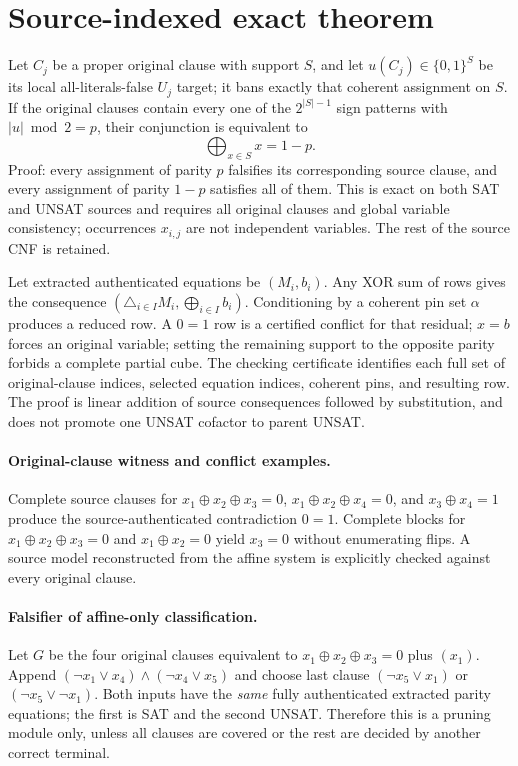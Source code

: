 \documentclass[11pt]{article}
\begin{document}
\section{Source-indexed exact theorem}
Let $C_j$ be a proper original clause with support $S$, and let $u(C_j)\in\{0,1\}^{S}$ be its local all-literals-false $U_j$ target; it bans exactly that coherent assignment on $S$. If the original clauses contain every one of the $2^{|S|-1}$ sign patterns with $|u|\bmod 2=p$, their conjunction is equivalent to
\[
\bigoplus_{x\in S}x=1-p.
\]
Proof: every assignment of parity $p$ falsifies its corresponding source clause, and every assignment of parity $1-p$ satisfies all of them. This is exact on both SAT and UNSAT sources and requires all original clauses and global variable consistency; occurrences $x_{i,j}$ are not independent variables. The rest of the source CNF is retained.

Let extracted authenticated equations be $(M_i,b_i)$. Any XOR sum of rows gives the consequence $(\triangle_{i\in I}M_i,\bigoplus_{i\in I}b_i)$. Conditioning by a coherent pin set $\alpha$ produces a reduced row. A $0=1$ row is a certified conflict for that residual; $x=b$ forces an original variable; setting the remaining support to the opposite parity forbids a complete partial cube. The checking certificate identifies each full set of original-clause indices, selected equation indices, coherent pins, and resulting row. The proof is linear addition of source consequences followed by substitution, and does not promote one UNSAT cofactor to parent UNSAT.

\paragraph{Original-clause witness and conflict examples.} Complete source clauses for $x_1\oplus x_2\oplus x_3=0$, $x_1\oplus x_2\oplus x_4=0$, and $x_3\oplus x_4=1$ produce the source-authenticated contradiction $0=1$. Complete blocks for $x_1\oplus x_2\oplus x_3=0$ and $x_1\oplus x_2=0$ yield $x_3=0$ without enumerating flips. A source model reconstructed from the affine system is explicitly checked against every original clause.

\paragraph{Falsifier of affine-only classification.}
Let $G$ be the four original clauses equivalent to $x_1\oplus x_2\oplus x_3=0$ plus $(x_1)$. Append $(\neg x_1\vee x_4)\wedge(\neg x_4\vee x_5)$ and choose last clause $(\neg x_5\vee x_1)$ or $(\neg x_5\vee\neg x_1)$. Both inputs have the \emph{same} fully authenticated extracted parity equations; the first is SAT and the second UNSAT. Therefore this is a pruning module only, unless all clauses are covered or the rest are decided by another correct terminal.
\end{document}
